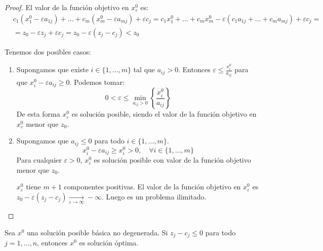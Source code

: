 \begin{proof}
    El valor de la función objetivo en $x^0_\varepsilon$ es:
    \begin{align*}
         & c_1(x^0_1 - \varepsilon a_{1j}) + \dots + c_m(x^0_m - \varepsilon a_{mj}) + \varepsilon c_j = c_1x^0_1 + \dots + c_mx^0_m - \varepsilon(c_1a_{1j} + \dots + c_ma_{mj}) + \varepsilon c_j = \\
         & = z_0 - \varepsilon z_j + \varepsilon c_j = z_0 - \varepsilon(z_j - c_j) < z_0
    \end{align*}

    Tenemos dos posibles casos:
    \begin{enumerate}
        \item Supongamos que existe $i \in \{1, \dots, m\}$ tal que $a_{ij} > 0$.
              Entonces $\varepsilon \leq \frac{x^0_i}{a_{ij}}$ para que $x^0_i - \varepsilon a_{ij} \geq 0$.
              Podemos tomar:
              $$0 < \varepsilon \leq \min_{a_{ij} > 0} \left\{\frac{x^0_i}{a_{ij}}\right\}$$
              De esta forma $x^0_\varepsilon$ es solución posible, siendo el valor de la función objetivo en $x^0_\varepsilon$ menor que $z_0$.
        \item Supongamos que $a_{ij} \leq 0$ para todo $i \in \{1, \dots, m\}$.
              $$x^0_i - \varepsilon a_{ij} \geq x^0_i > 0, \quad \forall i \in \{1, \dots, m\}$$
              Para cualquier $\varepsilon > 0$, $x^0_\varepsilon$ es solución posible con valor de la función objetivo menor que $z_0$.

              $x^0_\varepsilon$ tiene $m+1$ componentes positivas.
              El valor de la función objetivo en $x^0_\varepsilon$ es $z_0 - \varepsilon(z_j - c_j) \xrightarrow[\varepsilon \to \infty]{} -\infty$.
              Luego es un problema ilimitado.
    \end{enumerate}
\end{proof}

\begin{theorem}
    Sea $x^0$ una solución posible básica no degenerada.
    Si $z_j - c_j \leq 0$ para todo $j = 1, \dots, n$, entonces $x^0$ es solución óptima.
\end{theorem}


